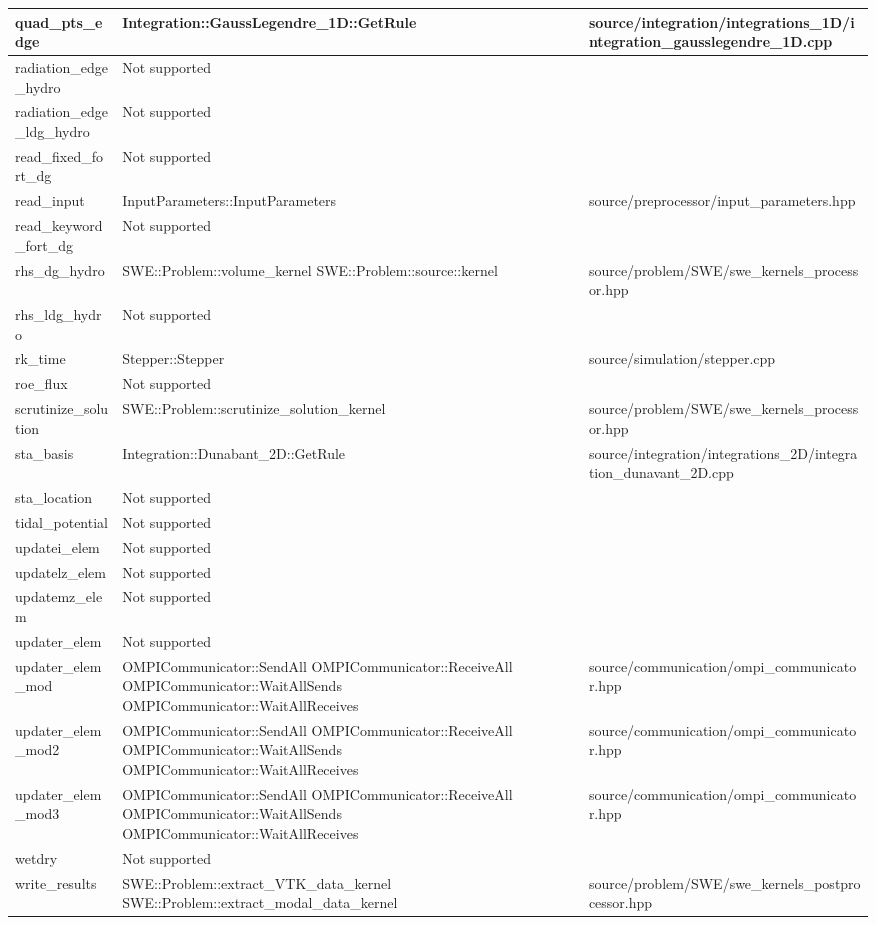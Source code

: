 {\begin{longtable}{ l | p{55mm} | p{86mm} }
quad\_pts\_edge & Integration::GaussLegendre\_1D::GetRule & source/integration/integrations\_1D/integration\_gausslegendre\_1D.cpp
\tabularnewline \hline
radiation\_edge\_hydro & Not supported &
\tabularnewline \hline
radiation\_edge\_ldg\_hydro & Not supported &	
\tabularnewline \hline
read\_fixed\_fort\_dg & Not supported &
\tabularnewline \hline
read\_input & InputParameters::InputParameters & source/preprocessor/input\_parameters.hpp
\tabularnewline \hline
read\_keyword\_fort\_dg & Not supported & 
\tabularnewline \hline
rhs\_dg\_hydro & SWE::Problem::volume\_kernel \newline SWE::Problem::source::kernel & source/problem/SWE/swe\_kernels\_processor.hpp
\tabularnewline \hline
rhs\_ldg\_hydro & Not supported &	
\tabularnewline \hline
rk\_time	& Stepper::Stepper & source/simulation/stepper.cpp
\tabularnewline \hline
roe\_flux & Not supported &
\tabularnewline \hline
scrutinize\_solution & SWE::Problem::scrutinize\_solution\_kernel & source/problem/SWE/swe\_kernels\_processor.hpp
\tabularnewline \hline
sta\_basis & Integration::Dunabant\_2D::GetRule & source/integration/integrations\_2D/integration\_dunavant\_2D.cpp
\tabularnewline \hline
sta\_location & Not supported &	
\tabularnewline \hline
tidal\_potential	& Not supported &	
\tabularnewline \hline
updatei\_elem & Not supported &
\tabularnewline \hline
updatelz\_elem & Not supported &
\tabularnewline \hline
updatemz\_elem & Not supported &	
\tabularnewline \hline
updater\_elem & Not supported &	
\tabularnewline \hline
updater\_elem\_mod & OMPICommunicator::SendAll \newline OMPICommunicator::ReceiveAll \newline OMPICommunicator::WaitAllSends \newline OMPICommunicator::WaitAllReceives & source/communication/ompi\_communicator.hpp
\tabularnewline \hline
updater\_elem\_mod2 & OMPICommunicator::SendAll \newline OMPICommunicator::ReceiveAll \newline OMPICommunicator::WaitAllSends \newline OMPICommunicator::WaitAllReceives & source/communication/ompi\_communicator.hpp
\tabularnewline \hline
updater\_elem\_mod3 & OMPICommunicator::SendAll \newline OMPICommunicator::ReceiveAll \newline OMPICommunicator::WaitAllSends \newline OMPICommunicator::WaitAllReceives & source/communication/ompi\_communicator.hpp
\tabularnewline \hline
wetdry & Not supported	&
\tabularnewline \hline
write\_results & SWE::Problem::extract\_VTK\_data\_kernel \newline SWE::Problem::extract\_modal\_data\_kernel &	 source/problem/SWE/swe\_kernels\_postprocessor.hpp
\tabularnewline \hline \hline
\end{longtable}
}

